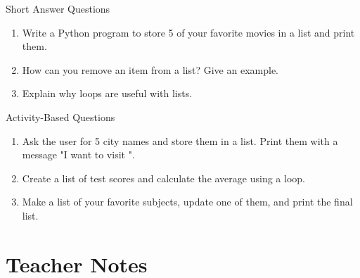 \begin{exercise}{Short Answer Questions}
\begin{enumerate}
    \item Write a Python program to store 5 of your favorite movies in a list and print them.  
    \item How can you remove an item from a list? Give an example.  
    \item Explain why loops are useful with lists.  
\end{enumerate}
\end{exercise}

\begin{exercise}{Activity-Based Questions}
\begin{enumerate}
    \item Ask the user for 5 city names and store them in a list. Print them with a message "I want to visit \underline{\hspace{2cm}}".
    \item Create a list of test scores and calculate the average using a loop.  
    \item Make a list of your favorite subjects, update one of them, and print the final list.  
\end{enumerate}
\end{exercise}

\section{Teacher Notes}

